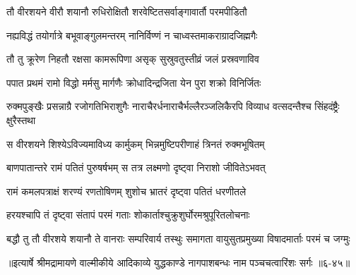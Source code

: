 \twolineshloka
{तौ वीरशयने वीरौ शयानौ रुधिरोक्षितौ}
{शरवेष्टितसर्वाङ्गावार्तौ परमपीडितौ} %

\twolineshloka
{नह्यविद्धं तयोर्गात्रे बभूवाङ्गुलमन्तरम्}
{नानिर्विण्णं न चाध्वस्तमाकराग्रादजिह्मगैः} %

\twolineshloka
{तौ तु क्रूरेण निहतौ रक्षसा कामरूपिणा}
{असृक् सुस्रुवतुस्तीव्रं जलं प्रस्रवणाविव} %

\twolineshloka
{पपात प्रथमं रामो विद्धो मर्मसु मार्गणैः}
{क्रोधादिन्द्रजिता येन पुरा शक्रो विनिर्जितः} %

\threelineshloka
{रुक्मपुङ्खैः प्रसन्नाग्रै रजोगतिभिराशुगैः}
{नाराचैरर्धनाराचैर्भल्लैरञ्जलिकैरपि}
{विव्याध वत्सदन्तैश्च सिंहदंष्ट्रैः क्षुरैस्तथा} %

\twolineshloka
{स वीरशयने शिश्येऽविज्यमाविध्य कार्मुकम्}
{भिन्नमुष्टिपरीणाहं त्रिनतं रुक्मभूषितम्} %

\twolineshloka
{बाणपातान्तरे रामं पतितं पुरुषर्षभम्}
{स तत्र लक्ष्मणो दृष्ट्वा निराशो जीवितेऽभवत्} %

\twolineshloka
{रामं कमलपत्राक्षं शरण्यं रणतोषिणम्}
{शुशोच भ्रातरं दृष्ट्वा पतितं धरणीतले} %

\twolineshloka
{हरयश्चापि तं दृष्ट्वा संतापं परमं गताः}
{शोकार्ताश्चुक्रुशुर्घोरमश्रुपूरितलोचनाः} %

\twolineshloka
{बद्धौ तु तौ वीरशये शयानौ ते वानराः सम्परिवार्य तस्थुः}
{समागता वायुसुतप्रमुख्या विषादमार्ताः परमं च जग्मुः} %


॥इत्यार्षे श्रीमद्रामायणे वाल्मीकीये आदिकाव्ये युद्धकाण्डे नागपाशबन्धः नाम पञ्चचत्वारिंशः सर्गः ॥६-४५॥
